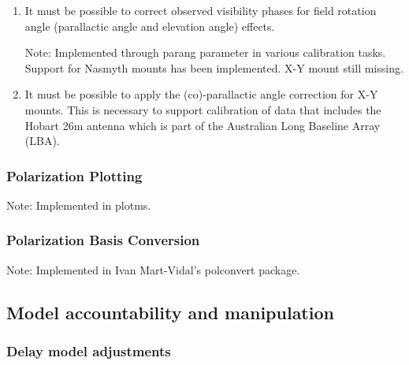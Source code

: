 \documentclass[11pt,a4paper]{article}
\begin{document}
\begin{enumerate}[subsubseclist]

\item It must be possible to correct observed visibility phases for
  field rotation angle (parallactic angle and elevation angle)
  effects.

  Note: Implemented through parang parameter in various calibration
  tasks.  Support for Nasmyth mounts has been implemented.  X-Y mount
  still missing.

\item It must be possible to apply the (co)-parallactic angle
  correction for X-Y mounts.  This is necessary to support calibration
  of data that includes the Hobart 26m antenna which is part of the
  Australian Long Baseline Array (LBA).

\end{enumerate}

\subsubsection{Polarization Plotting}

Note: Implemented in plotms.

\subsubsection{Polarization Basis Conversion}

Note: Implemented in Ivan Mart-Vidal's polconvert package.


\subsection{Model accountability and manipulation}

\subsubsection{Delay model adjustments}
\end{document}
